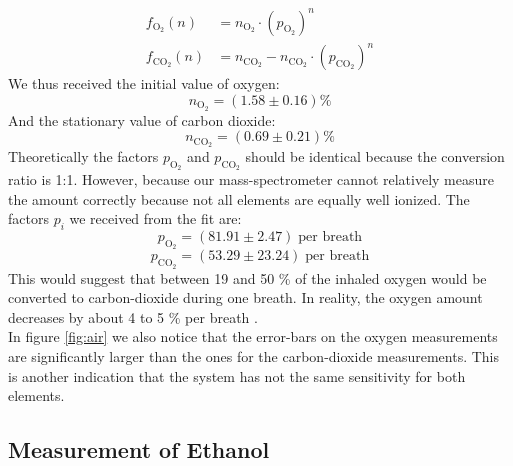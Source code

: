     \begin{align}
        f_{\text{O}_2}(n) &= n_{\text{O}_2} \cdot (p_{\text{O}_2})^n \label{eq:breath}\\
        f_{\text{CO}_2}(n) &= n_{\text{CO}_2} - n_{\text{CO}_2} \cdot (p_{\text{CO}_2})^n \label{eq:breath2}
    \end{align}
    We thus received the initial value of oxygen:
    $$ n_{\text{O}_2} = (1.58 \pm 0.16) \%$$
    And the stationary value of carbon dioxide:
    $$ n_{\text{CO}_2} = (0.69 \pm 0.21) \%$$
    Theoretically the factors $p_{\text{O}_2}$ and $p_{\text{CO}_2}$ should be identical because the conversion ratio is 1:1. However, because our mass-spectrometer cannot relatively measure the amount correctly because not all elements are equally well ionized. The factors $p_i$ we received from the fit are:
    $$p_{\text{O}_2} = (81.91 \pm 2.47) \;\text{per breath}$$
    $$p_{\text{CO}_2} = (53.29 \pm 23.24) \;\text{per breath}$$
    This would suggest that between 19 and 50 \% of the inhaled oxygen would be converted to carbon-dioxide during one breath.
    In reality, the oxygen amount decreases by about 4 to 5 \% per breath \cite{breath}.\\
    In figure \ref{fig:air} we also notice that the error-bars on the oxygen measurements are significantly larger than the ones for the carbon-dioxide measurements. This is another indication that the system has not the same sensitivity for both elements.
    
    
    \subsection{Measurement of Ethanol}
    
